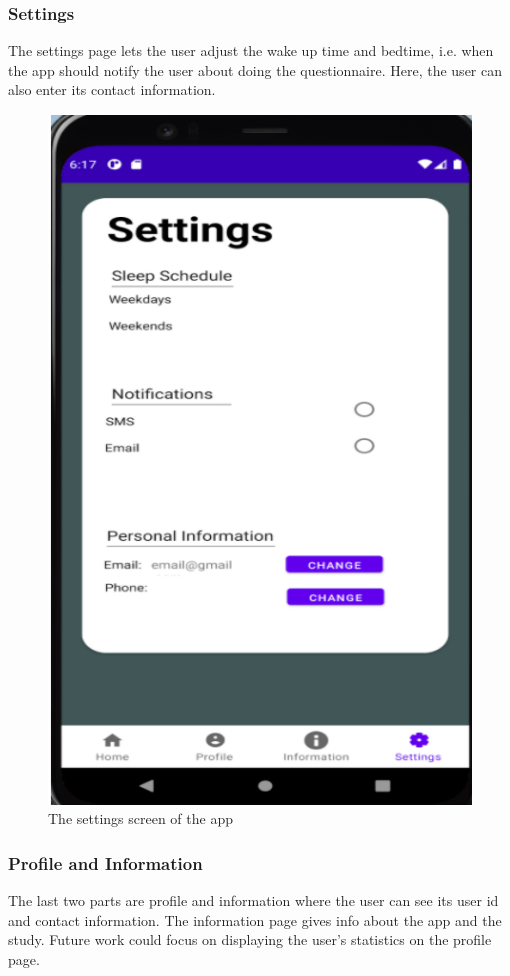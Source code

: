 \documentclass{article}
\begin{document}
\subsubsection{Settings}
The settings page lets the user adjust the wake up time and bedtime, i.e. when the app should notify the user about doing the questionnaire. Here, the user can also enter its contact information.

\begin{figure}[!h]
  \begin{center}
    \includegraphics[scale=0.8]{Android2.png}
    \caption{The settings screen of the app
}
    \label{fig:android2}
  \end{center}
\end{figure}

\subsubsection{Profile and Information}
The last two parts are profile and information where the user can see its user id and contact information. The information page gives info about the app and the study. Future work could focus on displaying the user’s statistics on the profile page. 
\end{document}
